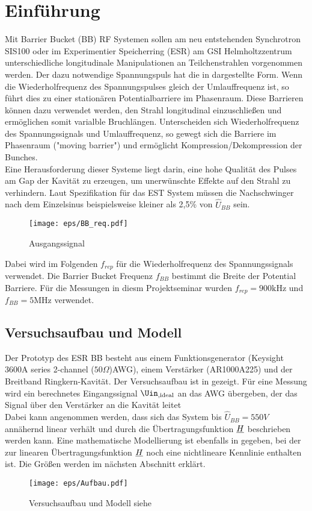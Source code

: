 \documentclass[../Report.tex]{subfiles}
\begin{document}
\chapter{Einführung}
\label{chap:einfuehrung}
Mit Barrier Bucket (BB) RF Systemen sollen am neu entstehenden Synchrotron SIS100 oder im Experimentier Speicherring (ESR) am GSI Helmholtzzentrum unterschiedliche longitudinale Manipulationen an Teilchenstrahlen vorgenommen werden. Der dazu notwendige Spannungspuls hat die in  dargestellte Form. Wenn die Wiederholfrequenz des Spannungspulses gleich der Umlauffrequenz ist, so führt dies zu einer stationären Potentialbarriere im Phasenraum. Diese Barrieren können dazu verwendet werden, den Strahl longitudinal einzuschließen und ermöglichen somit varialble Bruchlängen. Unterscheiden sich Wiederholfrequenz des Spannungssignals und Umlauffrequenz, so gewegt sich die Barriere im Phasenraum ("moving barrier") und ermöglicht Kompression/Dekompression der Bunches.\\ Eine Herausforderung dieser Systeme liegt darin, eine hohe Qualität des Pulses am Gap der Kavität zu erzeugen, um unerwünschte Effekte auf den Strahl zu verhindern. Laut Spezifikation für das EST System müssen die Nachschwinger nach dem Einzelsinus beispielsweise kleiner als 2,5\% von $\hat{U}_{BB}$ sein.
\begin{figure}[H]
  \centering
  \texttt{[image: eps/BB\_req.pdf]}
  \caption{Ausgangssignal}
  \label{fig:BB_req}
\end{figure}

Dabei wird im Folgenden $f_{rep}$ für die Wiederholfrequenz des Spannungssignals verwendet. Die Barrier Bucket Frequenz $f_{BB}$ bestimmt die Breite der Potential Barriere. Für die Messungen in diesm Projektseminar wurden ${f_{rep} = 900 \si{\kilo \hertz}}$ und ${f_{BB} = 5 \si{\mega \hertz}}$ verwendet.


\section[Modell und Konvention]{Versuchsaufbau und Modell}
\label{sec:einf.modell_BB}
Der Prototyp des ESR BB besteht aus einem Funktionsgenerator (Keysight 3600A series 2-channel ($50\Omega $)AWG), einem Verstärker (AR1000A225) und der Breitband Ringkern-Kavität. Der Versuchsaufbau ist in  gezeigt. Für eine Messung wird ein berechnetes Eingangssignal $\Uin_{\textrm{,ideal}}$ an das AWG übergeben, der das Signal über den Verstärker an die Kavität leitet\\Dabei kann angenommen werden, dass sich das System bis $\hat{U}_{BB} = 550V$ annähernd linear verhält und durch die Übertragungsfunktion $\underline{H}$ beschrieben werden kann. Eine mathematische Modellierung ist ebenfalls in  gegeben, bei der zur linearen Übertragungsfunktion $\underline{H}$ noch eine nichtlineare Kennlinie enthalten ist. Die Größen werden im nächsten Abschnitt erklärt.
\begin{figure}[H]
	\centering
	\texttt{[image: eps/Aufbau.pdf]}
	\caption{Versuchsaufbau und Modell siehe \cite{harzheim}}
  	\label{fig:Aufbau}
\end{figure}
\end{document}
